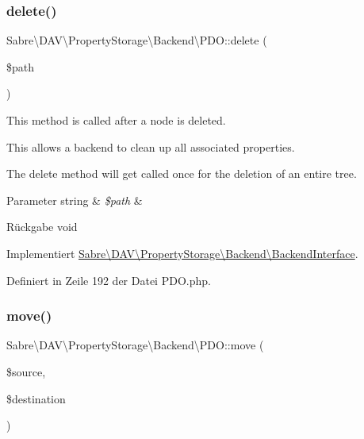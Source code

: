 \subsubsection{\texorpdfstring{delete()}{delete()}}
{\footnotesize\ttfamily Sabre\textbackslash{}\+D\+A\+V\textbackslash{}\+Property\+Storage\textbackslash{}\+Backend\textbackslash{}\+P\+D\+O\+::delete (\begin{DoxyParamCaption}\item[{}]{\$path }\end{DoxyParamCaption})}

This method is called after a node is deleted.

This allows a backend to clean up all associated properties.

The delete method will get called once for the deletion of an entire tree.


\begin{DoxyParams}[1]{Parameter}
string & {\em \$path} & \\
\hline
\end{DoxyParams}
\begin{DoxyReturn}{Rückgabe}
void 
\end{DoxyReturn}


Implementiert \mbox{\hyperlink{interface_sabre_1_1_d_a_v_1_1_property_storage_1_1_backend_1_1_backend_interface_a4930add42ecbd12a23515224b7c73e6c}{Sabre\textbackslash{}\+D\+A\+V\textbackslash{}\+Property\+Storage\textbackslash{}\+Backend\textbackslash{}\+Backend\+Interface}}.



Definiert in Zeile 192 der Datei P\+D\+O.\+php.

\mbox{\label{class_sabre_1_1_d_a_v_1_1_property_storage_1_1_backend_1_1_p_d_o_ab9d5112e4e012c25158c1d8fb66c2fa3}} 
\subsubsection{\texorpdfstring{move()}{move()}}
{\footnotesize\ttfamily Sabre\textbackslash{}\+D\+A\+V\textbackslash{}\+Property\+Storage\textbackslash{}\+Backend\textbackslash{}\+P\+D\+O\+::move (\begin{DoxyParamCaption}\item[{}]{\$source,  }\item[{}]{\$destination }\end{DoxyParamCaption})}

